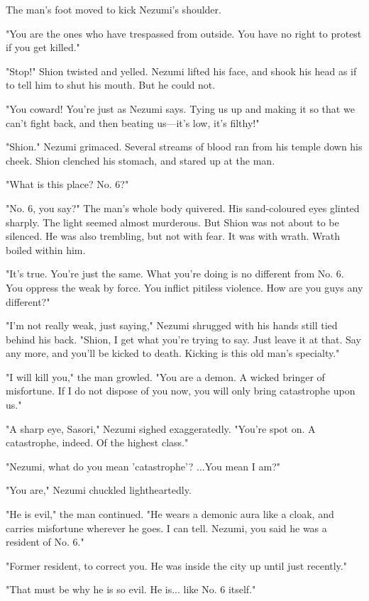 The man's foot moved to kick Nezumi's shoulder.

"You are the ones who have trespassed from outside. You have no right to
protest if you get killed."

"Stop!" Shion twisted and yelled. Nezumi lifted his face, and shook his
head as if to tell him to shut his mouth. But he could not.

"You coward! You're just as Nezumi says. Tying us up and making it so
that we can't fight back, and then beating us---it's low, it's filthy!"

"Shion." Nezumi grimaced. Several streams of blood ran from his temple
down his cheek. Shion clenched his stomach, and stared up at the man.

"What is this place? No. 6?"

"No. 6, you say?" The man's whole body quivered. His sand-coloured eyes
glinted sharply. The light seemed almost murderous. But Shion was not
about to be silenced. He was also trembling, but not with fear. It was
with wrath. Wrath boiled within him.

"It's true. You're just the same. What you're doing is no different from
No. 6. You oppress the weak by force. You inflict pitiless violence. How
are you guys any different?"

"I'm not really weak, just saying," Nezumi shrugged with his hands still
tied behind his back. "Shion, I get what you're trying to say. Just
leave it at that. Say any more, and you'll be kicked to death. Kicking
is this old man's specialty."

"I will kill you," the man growled. "You are a demon. A wicked bringer
of misfortune. If I do not dispose of you now, you will only bring
catastrophe upon us."

"A sharp eye, Sasori," Nezumi sighed exaggeratedly. "You're spot on. A
catastrophe, indeed. Of the highest class."

"Nezumi, what do you mean 'catastrophe'? ...You mean I am?"

"You are," Nezumi chuckled lightheartedly.

"He is evil," the man continued. "He wears a demonic aura like a cloak,
and carries misfortune wherever he goes. I can tell. Nezumi, you said he
was a resident of No. 6."

"Former resident, to correct you. He was inside the city up until just
recently."

"That must be why he is so evil. He is... like No. 6 itself."

